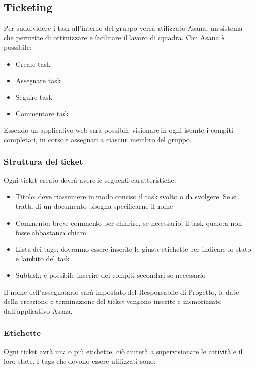 \subsection{Ticketing}

Per suddividere i task all'interno del gruppo verrà utilizzato Asana, un sistema che permette di ottimizzare e facilitare il lavoro di squadra. Con Asana è possibile:
\begin{itemize}
	\item Creare task
	\item Assegnare task
	\item Seguire task 
	\item Commentare task
\end{itemize}
Essendo un applicativo web sarà possibile visionare in ogni istante i compiti completati, in corso e assegnati a ciascun membro del gruppo.


\subsubsection{Struttura del ticket}
Ogni ticket creato dovrà avere le seguenti caratteristiche:
\begin{itemize}
	\item Titolo: deve riassumere in modo conciso il task svolto o da svolgere. Se si tratta di un documento bisogna specificarne il nome
	\item Commento: breve commento per chiarire, se necessario, il task qualora non fosse abbastanza chiaro
	\item Lista dei tags: dovranno essere inserite le giuste etichette per indicare lo stato e lambito del task 
	\item Subtask: è possibile inserire dei compiti secondari se necessario
\end{itemize}

Il nome dell'assegnatario sarà impostato del Responsabile di Progetto, le date della creazione e terminazione del ticket vengono inserite e memorizzate dall'applicativo Asana.

\subsubsection{Etichette}

Ogni ticket avrà una o più etichette, ciò aiuterà a supervisionare le attività e il loro stato. I tags che devono essere utilizzati sono:

